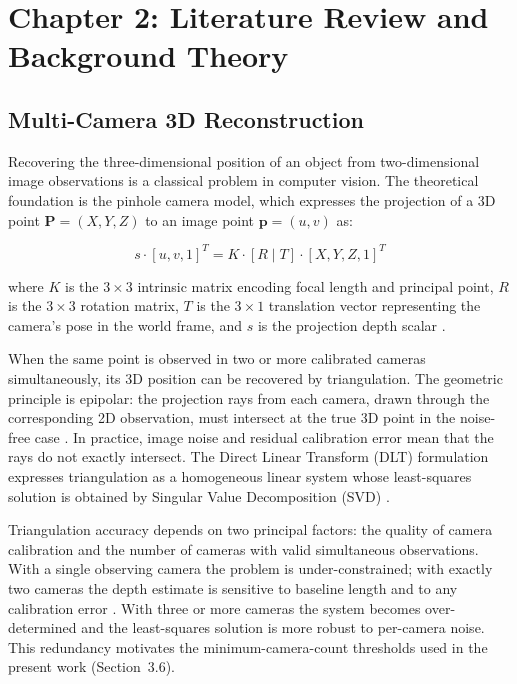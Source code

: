 \chapter{Chapter 2: Literature Review and Background Theory}

\section{Multi-Camera 3D Reconstruction}

Recovering the three-dimensional position of an object from two-dimensional image observations is a classical problem in computer vision. The theoretical foundation is the pinhole camera model, which expresses the projection of a 3D point $\mathbf{P} = (X, Y, Z)$ to an image point $\mathbf{p} = (u, v)$ as:

\begin{equation}
s \cdot [u, v, 1]^T = K \cdot [R \mid T] \cdot [X, Y, Z, 1]^T \label{eq:2_1}
\end{equation}

where $K$ is the $3 \times 3$ intrinsic matrix encoding focal length and principal point, $R$ is the $3 \times 3$ rotation matrix, $T$ is the $3 \times 1$ translation vector representing the camera's pose in the world frame, and $s$ is the projection depth scalar \cite{ref1}.

When the same point is observed in two or more calibrated cameras simultaneously, its 3D position can be recovered by triangulation. The geometric principle is epipolar: the projection rays from each camera, drawn through the corresponding 2D observation, must intersect at the true 3D point in the noise-free case \cite{ref2}. In practice, image noise and residual calibration error mean that the rays do not exactly intersect. The Direct Linear Transform (DLT) formulation expresses triangulation as a homogeneous linear system whose least-squares solution is obtained by Singular Value Decomposition (SVD) \cite{ref1}.

Triangulation accuracy depends on two principal factors: the quality of camera calibration and the number of cameras with valid simultaneous observations. With a single observing camera the problem is under-constrained; with exactly two cameras the depth estimate is sensitive to baseline length and to any calibration error \cite{ref4}. With three or more cameras the system becomes over-determined and the least-squares solution is more robust to per-camera noise. This redundancy motivates the minimum-camera-count thresholds used in the present work (Section~3.6).

